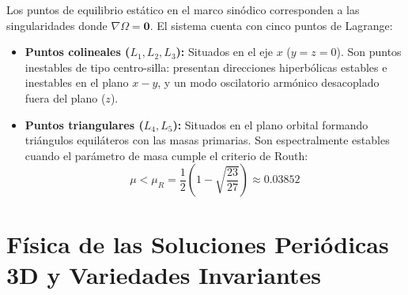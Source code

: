 \documentclass[11pt, a4paper]{article}
\begin{document}
	Los puntos de equilibrio estático en el marco sinódico corresponden a las singularidades donde $\nabla\Omega = \mathbf{0}$. El sistema cuenta con cinco puntos de Lagrange:
	\begin{itemize}[leftmargin=*]
		\item \textbf{Puntos colineales ($L_1, L_2, L_3$):} Situados en el eje $x$ ($y=z=0$). Son puntos inestables de tipo centro-silla: presentan direcciones hiperbólicas estables e inestables en el plano $x-y$, y un modo oscilatorio armónico desacoplado fuera del plano ($z$).
		\item \textbf{Puntos triangulares ($L_4, L_5$):} Situados en el plano orbital formando triángulos equiláteros con las masas primarias. Son espectralmente estables cuando el parámetro de masa cumple el criterio de Routh:
		\begin{equation}
			\mu < \mu_R = \frac{1}{2}\left(1 - \sqrt{\frac{23}{27}}\right) \approx 0.03852
		\end{equation}
	\end{itemize}
	
	\section{Física de las Soluciones Periódicas 3D y Variedades Invariantes}
	
\end{document}
